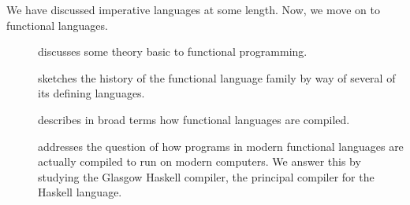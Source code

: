 \label{functional:overview}
We have discussed imperative languages at some length. Now, we move on to functional languages.

\begin{description}
\item[] discusses some theory basic to functional programming.
\item[] sketches the history of the functional language family by way of several of its defining languages.
\item[] describes in broad terms how functional languages are compiled. %
\item[] addresses the question of how programs in modern functional languages are actually compiled to run on modern computers. We answer this by studying the Glasgow Haskell compiler, the principal compiler for the Haskell language.
\end{description}